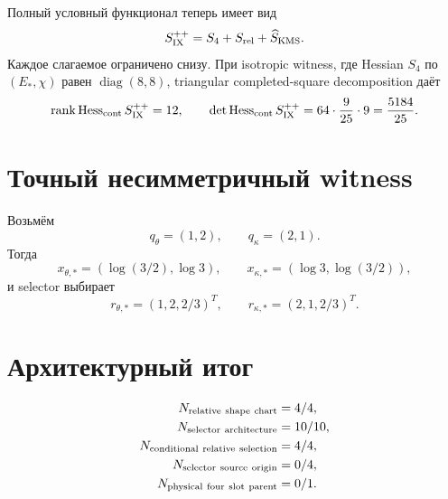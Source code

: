 Полный условный функционал теперь имеет вид
\begin{equation}
 S_{\rm IX}^{++}=S_4+S_{\rm rel}+\widehat S_{\rm KMS}.
 \label{eq:v9-kms-shape-selector-common-parent}
\end{equation}
Каждое слагаемое ограничено снизу. При isotropic witness, где Hessian
$S_4$ по $(E_*,\chi)$ равен $\operatorname{diag}(8,8)$, triangular
completed-square decomposition даёт
\begin{equation}
 \operatorname{rank}\operatorname{Hess}_{\rm cont}S_{\rm IX}^{++}=12,
 \qquad
 \det\operatorname{Hess}_{\rm cont}S_{\rm IX}^{++}
 =64\cdot\frac9{25}\cdot9=\frac{5184}{25}.
 \label{eq:v9-kms-shape-selector-common-hessian}
\end{equation}

\section{Точный несимметричный witness}

Возьмём
\begin{equation}
 q_\theta=(1,2),
 \qquad q_\kappa=(2,1).
 \label{eq:v9-kms-shape-selector-witness-sources}
\end{equation}
Тогда
\begin{equation}
 x_{\theta,*}=(\log(3/2),\log3),
 \qquad
 x_{\kappa,*}=(\log3,\log(3/2)),
 \label{eq:v9-kms-shape-selector-witness-minimum}
\end{equation}
и selector выбирает
\begin{equation}
 r_{\theta,*}=(1,2,2/3)^T,
 \qquad
 r_{\kappa,*}=(2,1,2/3)^T.
 \label{eq:v9-kms-shape-selector-witness-shapes}
\end{equation}

\section{Архитектурный итог}

\begin{equation}
 \begin{aligned}
 N_{\rm relative\ shape\ chart}&=4/4,\\
 N_{\rm selector\ architecture}&=10/10,\\
 N_{\rm conditional\ relative\ selection}&=4/4,\\
 N_{\rm selector\ source\ origin}&=0/4,\\
 N_{\rm physical\ four\ slot\ parent}&=0/1.
 \end{aligned}
 \label{eq:v9-kms-shape-selector-ledger}
\end{equation}

